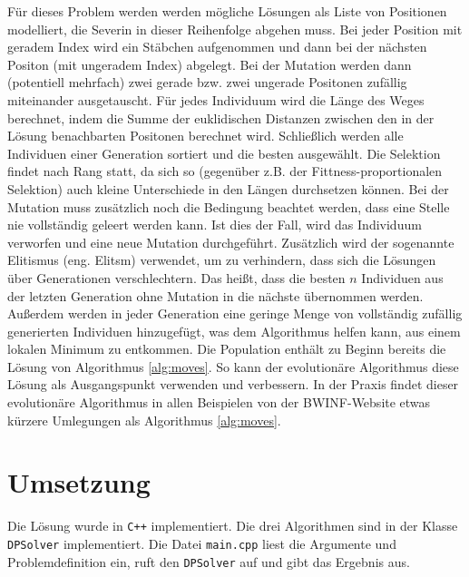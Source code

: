\documentclass[a4paper,10pt,ngerman]{scrartcl}
\begin{document}
Für dieses Problem werden werden mögliche Lösungen als Liste von Positionen modelliert, die Severin in dieser Reihenfolge abgehen muss. 
Bei jeder Position mit geradem Index wird ein Stäbchen aufgenommen und dann bei der nächsten Positon (mit ungeradem Index) abgelegt. 
Bei der Mutation werden dann (potentiell mehrfach) zwei gerade bzw. zwei ungerade Positonen zufällig miteinander ausgetauscht. 
Für jedes Individuum wird die Länge des Weges berechnet, indem die Summe der euklidischen Distanzen zwischen den in der Lösung benachbarten Positonen berechnet wird.
Schließlich werden alle Individuen einer Generation sortiert und die besten ausgewählt.
Die Selektion findet nach Rang statt, da sich so (gegenüber z.B. der Fittness-proportionalen Selektion) auch kleine Unterschiede in den Längen durchsetzen können. 
Bei der Mutation muss zusätzlich noch die Bedingung beachtet werden, dass eine Stelle nie vollständig geleert werden kann.
Ist dies der Fall, wird das Individuum verworfen und eine neue Mutation durchgeführt. 
Zusätzlich wird der sogenannte Elitismus (eng. Elitsm) verwendet, um zu verhindern, dass sich die Lösungen über Generationen verschlechtern. 
Das heißt, dass die besten $n$ Individuen aus der letzten Generation ohne Mutation in die nächste übernommen werden. 
Außerdem werden in jeder Generation eine geringe Menge von vollständig zufällig generierten Individuen hinzugefügt, was dem Algorithmus helfen kann, aus einem lokalen Minimum zu entkommen. 
Die Population enthält zu Beginn bereits die Lösung von Algorithmus \ref{alg:moves}. So kann der evolutionäre Algorithmus diese Lösung als Ausgangspunkt verwenden und verbessern. 
In der Praxis findet dieser evolutionäre Algorithmus in allen Beispielen von der BWINF-Website etwas kürzere Umlegungen als Algorithmus \ref{alg:moves}.






\section{Umsetzung}
Die Lösung wurde in \texttt{C++} implementiert. Die drei Algorithmen sind in der Klasse \lstinline{DPSolver} implementiert. Die Datei \texttt{main.cpp} liest die Argumente und Problemdefinition ein, ruft den \lstinline{DPSolver} auf und gibt das Ergebnis aus. 
\end{document}
